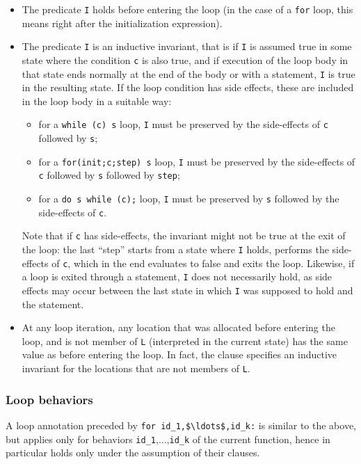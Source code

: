 \begin{itemize}
\item The predicate \lstinline|I| holds before entering the loop
  (in the case of a
  \lstinline|for| loop, this means right after the initialization expression).
\item The predicate \lstinline|I| is an inductive invariant, that is
  if \lstinline|I| is assumed true in some state where the condition
  \lstinline|c| is also true, and if execution of the loop body in
  that state ends normally at the end of the body or with a
  \Continue statement, \lstinline|I| is true in the
  resulting state. 
  If the loop condition has side effects, these are
  included in the loop body in a suitable way:
  \begin{itemize}
  \item for a \lstinline|while (c) s| loop, \lstinline|I| must be
    preserved by the side-effects of \lstinline|c| followed by
    \lstinline|s|;
  \item for a \lstinline|for(init;c;step) s| loop, \lstinline|I| must
    be preserved by the side-effects of \lstinline|c| followed by
    \lstinline|s| followed by \lstinline|step|;
  \item for a \lstinline|do s while (c);| loop, \lstinline|I| must be
    preserved by \lstinline|s| followed by the side-effects of
    \lstinline|c|.
  \end{itemize}
Note that if \lstinline|c| has side-effects, the invariant might not
be true at the exit of the loop: the last ``step'' starts from a state
where \lstinline|I| holds, performs the side-effects of \lstinline|c|,
which in the end evaluates to false and exits the loop. Likewise, if a
loop is exited through a \Break statement, \lstinline|I|
does not necessarily hold, as side effects may occur between
the last state in which \lstinline|I| was supposed to hold and 
the \Break statement.

\item At any loop iteration, any location that was allocated before
  entering the loop, and is not member of \lstinline|L| (interpreted in the
  current state) has the same value as
  before entering the loop.
  In fact, the \Loop \assigns clause specifies an inductive
  invariant for the locations that are not members of \lstinline|L|.
\end{itemize}

\subsubsection{Loop behaviors}
A loop annotation preceded by
\lstinline|for id_1,$\ldots$,id_k:| is similar to the above, but
applies only for behaviors \lstinline|id_1|,$\ldots$,\lstinline|id_k|
of the current function, 
hence in particular holds only under the assumption of their \assumes
clauses.


